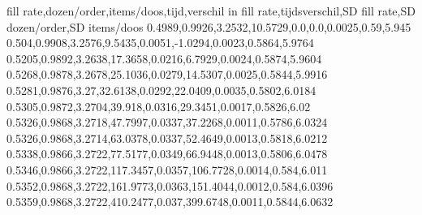 fill rate,dozen/order,items/doos,tijd,verschil in fill rate,tijdsverschil,SD fill rate,SD dozen/order,SD items/doos
0.4989,0.9926,3.2532,10.5729,0.0,0.0,0.0025,0.59,5.945
0.504,0.9908,3.2576,9.5435,0.0051,-1.0294,0.0023,0.5864,5.9764
0.5205,0.9892,3.2638,17.3658,0.0216,6.7929,0.0024,0.5874,5.9604
0.5268,0.9878,3.2678,25.1036,0.0279,14.5307,0.0025,0.5844,5.9916
0.5281,0.9876,3.27,32.6138,0.0292,22.0409,0.0035,0.5802,6.0184
0.5305,0.9872,3.2704,39.918,0.0316,29.3451,0.0017,0.5826,6.02
0.5326,0.9868,3.2718,47.7997,0.0337,37.2268,0.0011,0.5786,6.0324
0.5326,0.9868,3.2714,63.0378,0.0337,52.4649,0.0013,0.5818,6.0212
0.5338,0.9866,3.2722,77.5177,0.0349,66.9448,0.0013,0.5806,6.0478
0.5346,0.9866,3.2722,117.3457,0.0357,106.7728,0.0014,0.584,6.011
0.5352,0.9868,3.2722,161.9773,0.0363,151.4044,0.0012,0.584,6.0396
0.5359,0.9868,3.2722,410.2477,0.037,399.6748,0.0011,0.5844,6.0632
